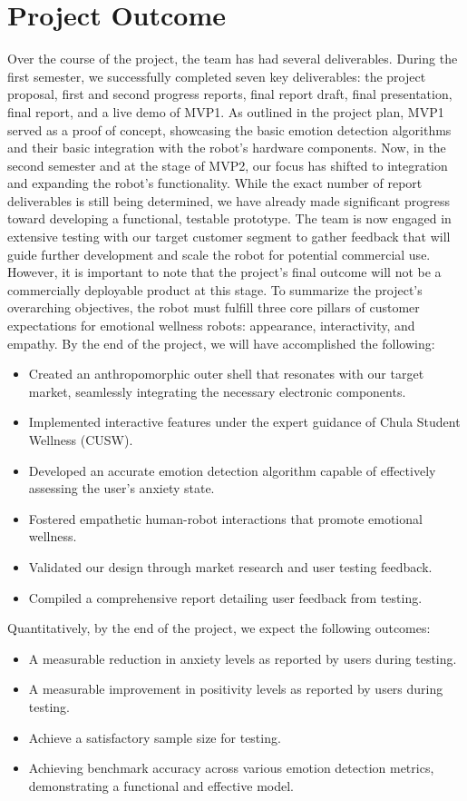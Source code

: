 \section{Project Outcome}

Over the course of the project, the team has had several deliverables. During the first semester, we successfully completed seven key deliverables: the project proposal, first and second progress reports, final report draft, final presentation, final report, and a live demo of MVP1. As outlined in the project plan, MVP1 served as a proof of concept, showcasing the basic emotion detection algorithms and their basic integration with the robot's hardware components.
Now, in the second semester and at the stage of MVP2, our focus has shifted to integration and expanding the robot's functionality. While the exact number of report deliverables is still being determined, we have already made significant progress toward developing a functional, testable prototype. The team is now engaged in extensive testing with our target customer segment to gather feedback that will guide further development and scale the robot for potential commercial use. However, it is important to note that the project’s final outcome will not be a commercially deployable product at this stage.
To summarize the project’s overarching objectives, the robot must fulfill three core pillars of customer expectations for emotional wellness robots: appearance, interactivity, and empathy. By the end of the project, we will have accomplished the following:
\begin{itemize}
\item Created an anthropomorphic outer shell that resonates with our target market, seamlessly integrating the necessary electronic components.
\item Implemented interactive features under the expert guidance of Chula Student Wellness (CUSW).
\item Developed an accurate emotion detection algorithm capable of effectively assessing the user’s anxiety state.
\item Fostered empathetic human-robot interactions that promote emotional wellness.
\item Validated our design through market research and user testing feedback.
\item Compiled a comprehensive report detailing user feedback from testing.
\end{itemize}
Quantitatively, by the end of the project, we expect the following outcomes:
\begin{itemize}
\item A measurable reduction in anxiety levels as reported by users during testing.
\item A measurable improvement in positivity levels as reported by users during testing.
\item Achieve a satisfactory sample size for testing.
\item Achieving benchmark accuracy across various emotion detection metrics, demonstrating a functional and effective model.
\end{itemize}
